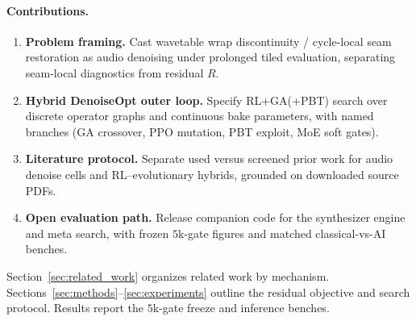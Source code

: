 \paragraph{Contributions.}
\begin{enumerate}
  \item \textbf{Problem framing.} Cast wavetable wrap discontinuity / cycle-local seam restoration as audio denoising under prolonged tiled evaluation, separating seam-local diagnostics from residual $R$.
  \item \textbf{Hybrid DenoiseOpt outer loop.} Specify RL+GA(+PBT) search over discrete operator graphs and continuous bake parameters, with named branches (GA crossover, PPO mutation, PBT exploit, MoE soft gates).
  \item \textbf{Literature protocol.} Separate used versus screened prior work for audio denoise cells and RL--evolutionary hybrids, grounded on downloaded source PDFs.
  \item \textbf{Open evaluation path.} Release companion code for the synthesizer engine and meta search, with frozen $5$k-gate figures and matched classical-vs-AI benches.
\end{enumerate}

Section~\ref{sec:related_work} organizes related work by mechanism.
Sections~\ref{sec:methods}--\ref{sec:experiments} outline the residual objective and search protocol.
Results report the $5$k-gate freeze and inference benches.
